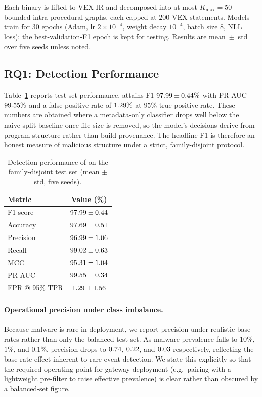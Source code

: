 \documentclass{llncs}
\begin{document}
Each binary is lifted to VEX IR and decomposed into at most $K_{\max}=50$
bounded intra-procedural graphs, each capped at $200$ VEX statements.
Models train for $30$ epochs (Adam, lr $2\times10^{-4}$, weight decay
$10^{-4}$, batch size $8$, NLL loss); the best-validation-F1 epoch is kept
for testing. Results are mean~$\pm$~std over five seeds unless noted.

\subsection{RQ1: Detection Performance}
\label{sec:detection}

Table~\ref{tab:detection} reports test-set performance. 
attains F1 $97.99{}\pm0.44{}\%$ with PR-AUC $99.55{}\%$ and a
false-positive rate of $1.29{}\%$ at $95\%$ true-positive rate. These
numbers are obtained where a metadata-only classifier drops well below the
naive-split baseline once file size is removed, so the model's decisions derive from program
structure rather than build provenance. The headline F1 is therefore an
honest measure of malicious structure under a strict, family-disjoint
protocol.

\begin{table}[t]
\centering
\caption{Detection performance of  on the family-disjoint test
set (mean $\pm$ std, five seeds).}
\label{tab:detection}
\begin{tabular}{lc}
\hline
Metric & Value (\%) \\
\hline
F1-score        & $97.99 \pm 0.44$ \\
Accuracy        & $97.69 \pm 0.51$ \\
Precision       & $96.99 \pm 1.06$ \\
Recall          & $99.02 \pm 0.63$ \\
MCC             & $95.31 \pm 1.04$ \\
PR-AUC          & $99.55 \pm 0.34$ \\
FPR @ 95\% TPR  & $1.29 \pm 1.56$ \\
\hline
\end{tabular}
\end{table}

\paragraph{Operational precision under class imbalance.}
Because malware is rare in deployment, we report precision under realistic
base rates rather than only the balanced test set. As malware prevalence
falls to $10\%$, $1\%$, and $0.1\%$, precision drops to $0.74$, $0.22$,
and $0.03$ respectively, reflecting the base-rate effect inherent to
rare-event detection. We state this explicitly so that the required
operating point for gateway deployment (e.g.\ pairing  with a
lightweight pre-filter to raise effective prevalence) is clear rather than
obscured by a balanced-set figure.
\end{document}
